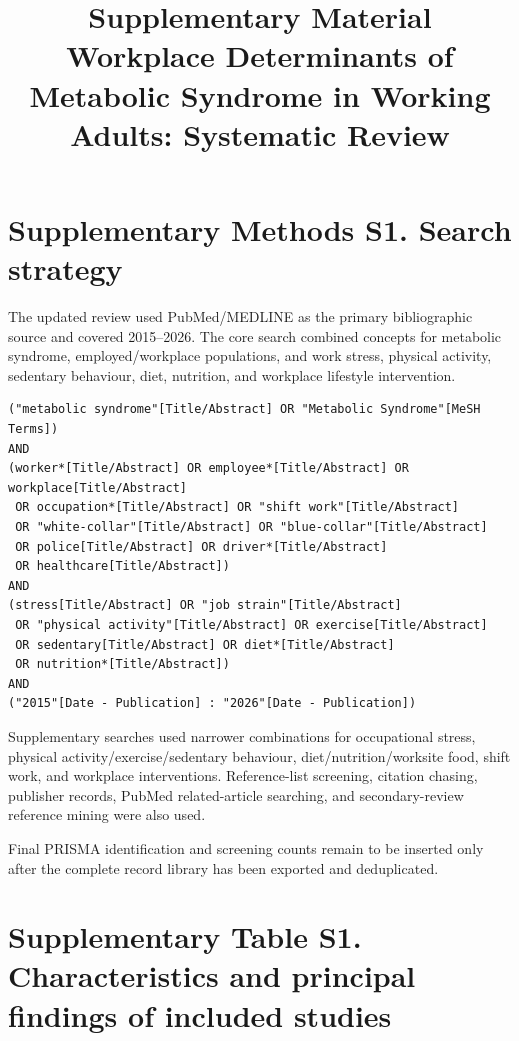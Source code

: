 \documentclass[10pt]{article}
\title{Supplementary Material\\Workplace Determinants of Metabolic Syndrome in Working Adults: Systematic Review}
\author{}
\date{}
\begin{document}
\maketitle

\section*{Supplementary Methods S1. Search strategy}

The updated review used PubMed/MEDLINE as the primary bibliographic source and covered 2015--2026. The core search combined concepts for metabolic syndrome, employed/workplace populations, and work stress, physical activity, sedentary behaviour, diet, nutrition, and workplace lifestyle intervention.

\begin{verbatim}
("metabolic syndrome"[Title/Abstract] OR "Metabolic Syndrome"[MeSH Terms])
AND
(worker*[Title/Abstract] OR employee*[Title/Abstract] OR workplace[Title/Abstract]
 OR occupation*[Title/Abstract] OR "shift work"[Title/Abstract]
 OR "white-collar"[Title/Abstract] OR "blue-collar"[Title/Abstract]
 OR police[Title/Abstract] OR driver*[Title/Abstract]
 OR healthcare[Title/Abstract])
AND
(stress[Title/Abstract] OR "job strain"[Title/Abstract]
 OR "physical activity"[Title/Abstract] OR exercise[Title/Abstract]
 OR sedentary[Title/Abstract] OR diet*[Title/Abstract]
 OR nutrition*[Title/Abstract])
AND
("2015"[Date - Publication] : "2026"[Date - Publication])
\end{verbatim}

Supplementary searches used narrower combinations for occupational stress, physical activity/exercise/sedentary behaviour, diet/nutrition/worksite food, shift work, and workplace interventions. Reference-list screening, citation chasing, publisher records, PubMed related-article searching, and secondary-review reference mining were also used.

Final PRISMA identification and screening counts remain to be inserted only after the complete record library has been exported and deduplicated.

\section*{Supplementary Table S1. Characteristics and principal findings of included studies}
\end{document}
